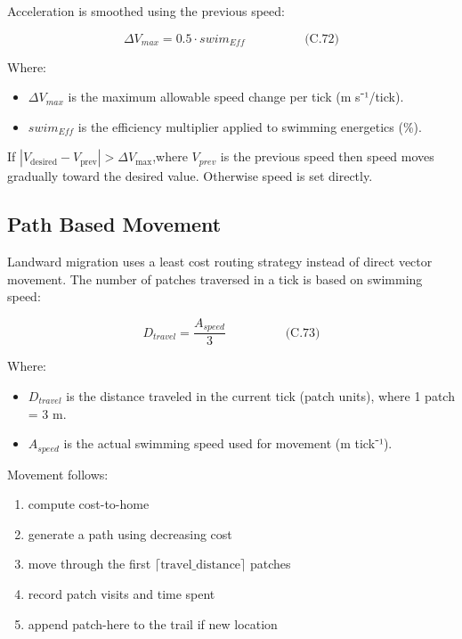 \documentclass[
]{book}
\providecommand{\tightlist}{%
  \setlength{\itemsep}{0pt}\setlength{\parskip}{0pt}}
\begin{document}
Acceleration is smoothed using the previous speed:

\[
\begin{equation} \Delta V_{max} = 0.5 \cdot swim_{Eff}  \hspace{2cm} \text{(C.72)} \end{equation}
\]

Where:

\begin{itemize}
\tightlist
\item
  \(\Delta V_{max}\) is the maximum allowable speed change per tick (m
  s⁻¹/tick).
\item
  \(swim_{Eff}\) is the efficiency multiplier applied to swimming
  energetics (\%).
\end{itemize}

If \(|V_{\text{desired}} - V_{\text{prev}}| > \Delta V_{\max}\),where
\(V_{prev}\) is the previous speed then speed moves gradually toward the
desired value. Otherwise speed is set directly.

\subsection{Path Based Movement}\label{path-based-movement}

Landward migration uses a least cost routing strategy instead of direct
vector movement. The number of patches traversed in a tick is based on
swimming speed:

\[
\begin{equation} D_{travel} = \frac{A_{speed}}{3}  \hspace{2cm} \text{(C.73)} \end{equation}
\]

Where:

\begin{itemize}
\tightlist
\item
  \(D_{travel}\) is the distance traveled in the current tick (patch
  units), where 1 patch = 3 m.
\item
  \(A_{speed}\) is the actual swimming speed used for movement (m
  tick⁻¹).
\end{itemize}

Movement follows:

\begin{enumerate}
\def\labelenumi{\arabic{enumi}.}
\tightlist
\item
  compute cost-to-home
\item
  generate a path using decreasing cost
\item
  move through the first \(\lceil \text{travel_distance} \rceil\)
  patches
\item
  record patch visits and time spent
\item
  append patch-here to the trail if new location
\end{enumerate}
\end{document}
